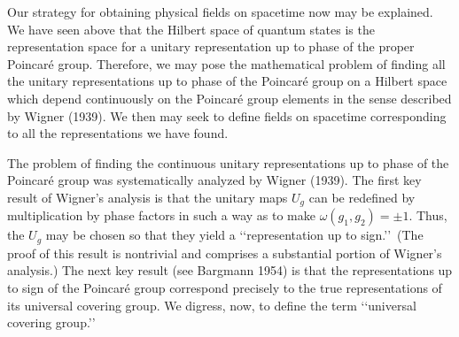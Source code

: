 Our strategy for obtaining physical fields on spacetime now may be explained. We
have seen above that the Hilbert space of quantum states is the representation space
for a unitary representation up to phase of the proper Poincar\'e group. Therefore,
we may pose the mathematical problem of finding all the unitary representations up
to phase of the Poincar\'e group on a Hilbert space which depend continuously on the
Poincar\'e group elements in the sense described by Wigner (1939). We then may seek
to define fields on spacetime corresponding to all the representations we have found.

The problem of finding the continuous unitary representations up to phase of the
Poincar\'e group was systematically analyzed by Wigner (1939). The first key result
of Wigner's analysis is that the unitary maps \(U_g\) can be redefined by
multiplication by phase factors in such a way as to make
\(\omega(g_1,g_2)=\pm1\). Thus, the \(U_g\) may be chosen so that they yield a
\lq\lq representation up to sign.\rq\rq\ (The proof of this result is nontrivial and
comprises a substantial portion of Wigner's analysis.) The next key result (see
Bargmann 1954) is that the representations up to sign of the Poincar\'e group
correspond precisely to the true representations of its universal covering group. We
digress, now, to define the term \lq\lq universal covering group.\rq\rq\

